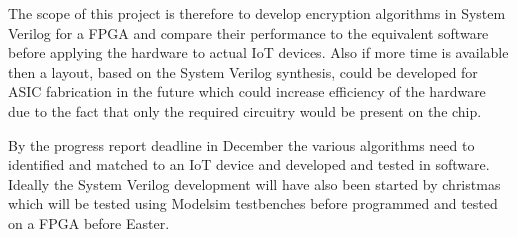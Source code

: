 \documentclass[11pt]{article}
\begin{document}
   The scope of this project is therefore to develop encryption algorithms in System Verilog for a FPGA and compare their performance to the equivalent software before applying the hardware to actual IoT devices. Also if more time is available then a layout, based on the System Verilog synthesis, could be developed for ASIC fabrication in the future which could increase efficiency of the hardware due to the fact that only the required circuitry would be present on the chip.
   
   By the progress report deadline in December the various algorithms need to identified and matched to an IoT device and developed and tested in software. Ideally the System Verilog development will have also been started by christmas which will be tested using Modelsim testbenches before programmed and tested on a FPGA before Easter.
\end{document}
